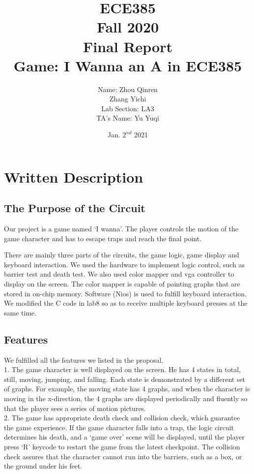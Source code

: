 \documentclass[12pt]{article}
\title{
    \textbf{\Huge ECE385} \\
    \huge Fall 2020 \\
    \huge Final Report \\[120pt]
    \textbf{\Huge Game: I Wanna an A in ECE385} \\[120pt]
    }
\author{
    \large Name: Zhou Qinren \\ 
            \quad\qquad Zhang Yichi \\ 
    \large Lab Section: LA3 \\ 
    \large TA's Name: Yu Yuqi
    }
\date{Jan. $2^{nd}$ 2021}
\begin{document}
\setlength{\parindent}{0pt}
\maketitle
\newpage

\section{Written Description}
\subsection{The Purpose of the Circuit}
Our project is a game named ‘I wanna’. The player controls the motion of the game character and has to escape traps and reach the final point. 

There are mainly three parts of the circuits, the game logic, game display and keyboard interaction. We used the hardware to implement logic control, such as barrier test and death test. We also used color mapper and vga controller to display on the screen. The color mapper is capable of painting graphs that are stored in on-chip memory. Software (Nios) is used to fulfill keyboard interaction. We modified the C code in lab8 so as to receive multiple keyboard presses at the same time. 

\subsection{Features}
We fulfilled all the features we listed in the proposal. \\

1.	The game character is well displayed on the screen. He has 4 states in total, still, moving, jumping, and falling. Each state is demonstrated by a different set of graphs. For example, the moving state has 4 graphs, and when the character is moving in the x-direction, the 4 graphs are displayed periodically and fluently so that the player sees a series of motion pictures. \\

2.	The game has appropriate death check and collision check, which guarantee the game experience. If the game character falls into a trap, the logic circuit determines his death, and a ‘game over’ scene will be displayed, until the player press ‘R’ keycode to restart the game from the latest checkpoint. The collision check assures that the character cannot run into the barriers, such as a box, or the ground under his feet. \\
\end{document}
